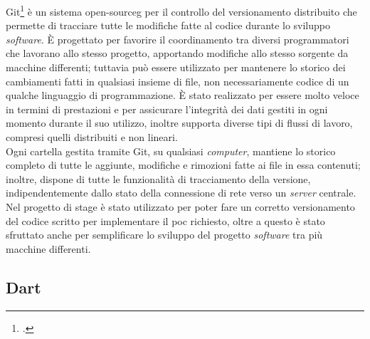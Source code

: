 Git\footcite{site:git} è un sistema \gls{open-sourceg} per il controllo del versionamento distribuito che permette di tracciare tutte le modifiche fatte al codice durante lo sviluppo \textit{software}. È progettato per favorire il coordinamento tra diversi programmatori che lavorano allo stesso progetto, apportando modifiche allo stesso sorgente da macchine differenti; tuttavia può essere utilizzato per mantenere lo storico dei cambiamenti fatti in qualsiasi insieme di file, non necessariamente codice di un qualche linguaggio di programmazione. È stato realizzato per essere molto veloce in termini di prestazioni e per assicurare l'integrità dei dati gestiti in ogni momento durante il suo utilizzo, inoltre supporta diverse tipi di flussi di lavoro, compresi quelli distribuiti e non lineari.\\
Ogni cartella gestita tramite Git, su qualsiasi \textit{computer}, mantiene lo storico completo di tutte le aggiunte, modifiche e rimozioni fatte ai file in essa contenuti; inoltre, dispone di tutte le funzionalità di tracciamento della versione, indipendentemente dallo stato della connessione di rete verso un \textit{server} centrale.\\
Nel progetto di stage è stato utilizzato per poter fare un corretto versionamento del codice scritto per implementare il \gls{poc} richiesto, oltre a questo è stato sfruttato anche per semplificare lo sviluppo del progetto \textit{software} tra più macchine differenti.

\subsection{Dart}

